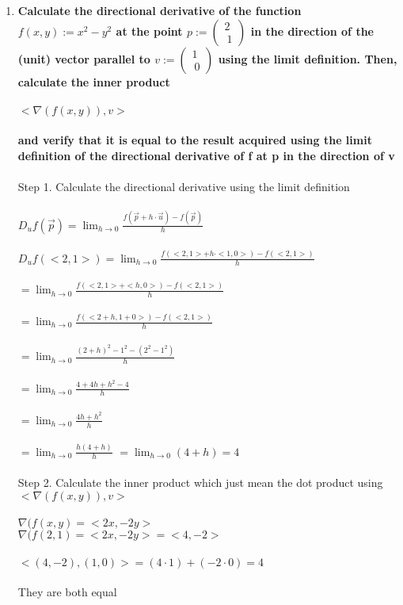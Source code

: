 \documentclass{article}
\begin{document}
\begin{enumerate}[12.]
\item\textbf{Calculate the directional derivative of the function $f(x, y) := x^2-y^2$ at the point $p := \left(\!\begin{array}{c} 2 \\\ 1 \end{array} \!\right)$ in the direction of the (unit) vector parallel to $v := \left(\!\begin{array}{c} 1 \\\ 0 \end{array} \!\right)$ using the limit definition. Then, calculate the inner product\\
\\
$<\nabla(f(x,y)),v>$\\\\and verify that it is equal to the result acquired using the limit definition of the directional derivative of f at p in the direction of v}\\
\\
Step 1. Calculate the directional derivative using the limit definition\\
\\
	$D_{u}f(\vec{p})=\lim_{h \to 0} \frac{f(\vec{p}+h\cdot\vec{u})-f(\vec{p})}{h}$\\
	\\
	$D_{u}f(<2,1>)=\lim_{h \to 0} \frac{f(<2,1>+h\cdot<1,0>)-f(<2,1>)}{h}$\\
	\\
	$=\lim_{h \to 0} \frac{f(<2,1>+<h,0>)-f(<2,1>)}{h}$\\
	\\
	$=\lim_{h \to 0} \frac{f(<2+h,1+0>)-f(<2,1>)}{h}$\\
	\\
	$=\lim_{h \to 0} \frac{(2+h)^{2}-1^{2}-(2^{2}-1^{2})}{h}$\\
	\\
	$=\lim_{h \to 0} \frac{4+4h+h^{2}-4}{h}$\\
	\\
	$=\lim_{h \to 0} \frac{4h+h^{2}}{h}$\\
	\\
	$=\lim_{h \to 0} \frac{h(4+h)}{h}$
	$=\lim_{h \to 0} (4+h)=4$
\\
\\
Step 2. Calculate the inner product which just mean the dot product using $<\nabla(f(x,y)),v>$
\\
\\
$\nabla(f(x,y)=<2x,-2y>$\\
$\nabla(f(2,1)=<2x,-2y>=<4,-2>$\\
\\
$<(4,-2),(1,0)>=(4\cdot1)+(-2\cdot0)=4$
\\
\\
They are both equal 
\end{enumerate}
\end{document}
